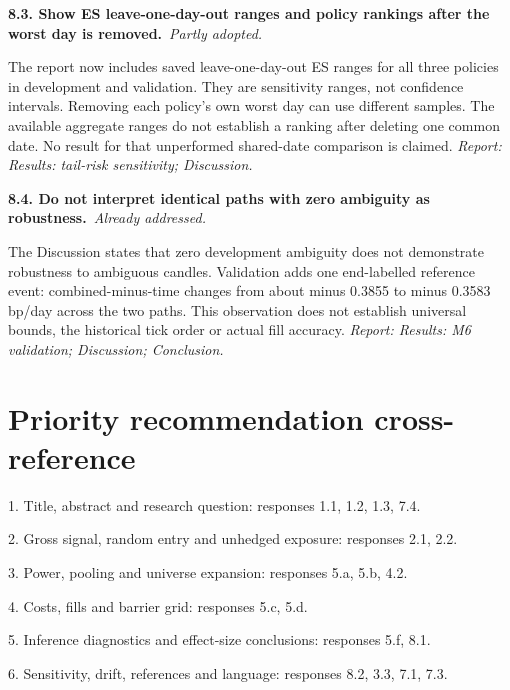 \documentclass[11pt,a4paper]{article}
\newcommand{\reply}[3]{\par\addvspace{5pt}\noindent\textbf{#1. #2}\ \textit{#3.}\par\nobreak}
\begin{document}
\par\noindent\begin{minipage}{\linewidth}\justifying
\reply{8.3}{Show ES leave-one-day-out ranges and policy rankings after the worst day is removed.}{Partly adopted}
The report now includes saved leave-one-day-out ES ranges for all three policies in development and validation. They are sensitivity ranges, not confidence intervals. Removing each policy's own worst day can use different samples. The available aggregate ranges do not establish a ranking after deleting one common date. No result for that unperformed shared-date comparison is claimed.
{\small\textit{Report: Results: tail-risk sensitivity; Discussion.}}
\end{minipage}\par\addvspace{5pt}

\par\noindent\begin{minipage}{\linewidth}\justifying
\reply{8.4}{Do not interpret identical paths with zero ambiguity as robustness.}{Already addressed}
The Discussion states that zero development ambiguity does not demonstrate robustness to ambiguous candles. Validation adds one end-labelled reference event: combined-minus-time changes from about minus 0.3855 to minus 0.3583 bp/day across the two paths. This observation does not establish universal bounds, the historical tick order or actual fill accuracy.
{\small\textit{Report: Results: M6 validation; Discussion; Conclusion.}}
\end{minipage}\par\addvspace{5pt}

\section*{Priority recommendation cross-reference}
1. Title, abstract and research question: responses 1.1, 1.2, 1.3, 7.4.\par
2. Gross signal, random entry and unhedged exposure: responses 2.1, 2.2.\par
3. Power, pooling and universe expansion: responses 5.a, 5.b, 4.2.\par
4. Costs, fills and barrier grid: responses 5.c, 5.d.\par
5. Inference diagnostics and effect-size conclusions: responses 5.f, 8.1.\par
6. Sensitivity, drift, references and language: responses 8.2, 3.3, 7.1, 7.3.\par
\end{document}
